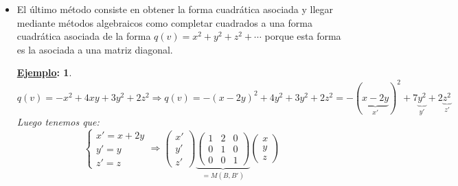 \documentclass[10pt,a4paper,openright]{book}
\theoremstyle{break}
\newtheorem*{ej}{\underline{Ejemplo}:}
\begin{document}
\begin{itemize}
\item El último método consiste en obtener la forma cuadrática asociada y llegar mediante métodos algebraicos como completar cuadrados a una forma cuadrática asociada de la forma $q(v) = x^2+y^2+z^2+\cdots$ porque esta forma es la asociada a una matriz diagonal.
	\begin{ej}
	$$q(v) = -x^2+4xy+3y^2+2z^2 \Rightarrow q(v)= -(x-2y)^2+4y^2+3y^2+2z^2 =-(\underbrace{x-2y}_{x'})^2+7\underbrace{y^2}_{y'}+2\underbrace{z^2}_{z'} $$
	Luego tenemos que:
	$$\begin{cases} x' = x+2y \\ y' = y \\ z'=z\end{cases}\Rightarrow
\begin{pmatrix}x' \\ y' \\ z'\end{pmatrix} \underbrace{\begin{pmatrix} 1 & 2 & 0 \\ 0 & 1 & 0 \\ 0 & 0 & 1\end{pmatrix}}_{=M(B,B')} \begin{pmatrix}x \\ y \\ z\end{pmatrix}$$
	\end{ej}
\end{itemize}
\end{document}
